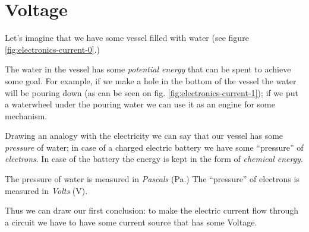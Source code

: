 \documentclass[../sparc.tex]{subfiles}
\begin{document}
\section{Voltage}

Let's imagine that we have some vessel filled with water (see figure
\ref{fig:electronics-current-0}.)


The water in the vessel has some \emph{potential energy} that can be spent to
achieve some goal.  For example, if we make a hole in the bottom of the vessel
the water will be pouring down (as can be seen on
fig. \ref{fig:electronics-current-1}); if we put a waterwheel under the pouring
water we can use it as an engine for some mechanism.


Drawing an analogy with the electricity we can say that our vessel has some
\emph{pressure} of water; in case of a charged electric battery we have some
``pressure'' of \emph{electrons}.  In case of the battery the energy is kept in
the form of \emph{chemical energy}.

The pressure of water is measured in \emph{Pascals} (Pa.)  The ``pressure'' of
electrons is measured in \emph{Volts} (V).

Thus we can draw our first conclusion: to make the electric current flow through
a circuit we have to have some current source that has some Voltage.
\end{document}
